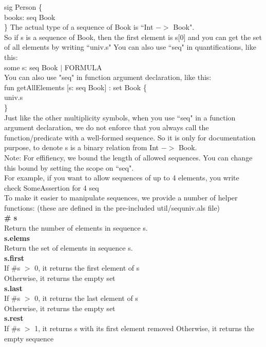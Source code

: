 \documentclass[a4paper,12pt]{extarticle}
\begin{document}
  sig Person \{ \\
      books: seq Book \\
  \}
The actual type of a sequence of Book is ``Int $->$ Book".\\
So if s is a sequence of Book, then the first element is s[0]
and you can get the set of all elements by writing ``univ.s"
You can also use ``seq" in quantifications, like this: \\
some s: seq Book $|$ FORMULA\\
You can also use "seq" in function argument declaration, like this: \\
  fun getAllElements [s: seq Book] : set Book \{ \\
      univ.s\\
  \} \\
Just like the other multiplicity symbols, when you use ``seq" in a function argument declaration, we do not enforce that you always call the function/predicate with a well-formed sequence. So it is only for documentation purpose, to denote s is a binary relation from Int $->$ Book. \\
Note: For effifiency, we bound the length of allowed sequences. You can change this bound by setting the scope on ``seq".\\
For example, if you want to allow sequences of up to 4 elements, you write \\
  check SomeAssertion for 4 seq \\
To make it easier to manipulate sequences, we provide a number of helper functions: (these are defined in the pre-included util/sequniv.als file) \\
\textbf{ \# s } \\
Return the number of elements in sequence s.\\
\textbf{s.elems} \\
Return the set of elements in sequence s.\\
\textbf{s.first} \\
If \#s $>$ 0, it returns the first element of s\\
Otherwise, it returns the empty set\\
\textbf{s.last} \\
If \#s $>$ 0, it returns the last element of s\\
Otherwise, it returns the empty set\\
\textbf{s.rest} \\
If \#s $>$ 1, it returns s with its first element removed
Otherwise, it returns the empty sequence\\
\end{document}
